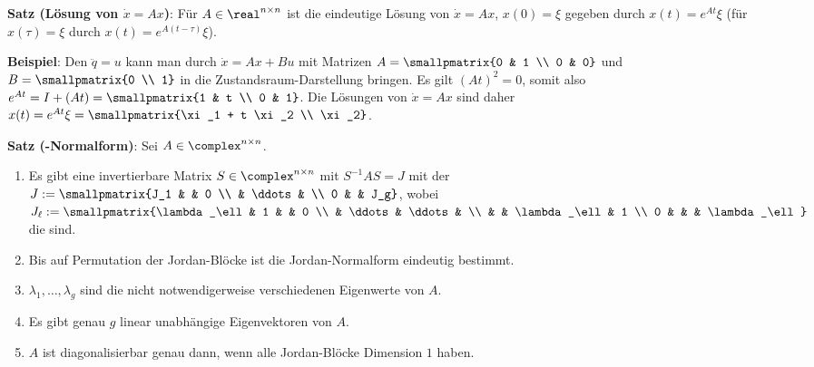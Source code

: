 \textbf{Satz (Lösung von $\dot{x} = Ax$)}:
Für $A \in \real^{n \times n}$ ist die eindeutige Lösung von $\dot{x} = Ax$, $x(0) = \xi$
gegeben durch $x(t) = e^{At} \xi$
(für $x(\tau) = \xi$ durch $x(t) = e^{A(t - \tau)} \xi$).

\textbf{Beispiel}:
Den  $\ddot{q} = u$ kann man durch
$\dot{x} = Ax + Bu$ mit Matrizen $A = \smallpmatrix{0 & 1 \\ 0 & 0}$ und
$B = \smallpmatrix{0 \\ 1}$ in die Zustandsraum-Darstellung bringen.
Es gilt $(At)^2 = 0$, somit also $e^{At} = I + (At) = \smallpmatrix{1 & t \\ 0 & 1}$.
Die Lösungen von $\dot{x} = Ax$ sind daher
$x(t) = e^{At} \xi = \smallpmatrix{\xi_1 + t \xi_2 \\ \xi_2}$.

\linie
\pagebreak

\textbf{Satz (-Normalform)}:
Sei $A \in \complex^{n \times n}$.
\begin{enumerate}
    \item
    Es gibt eine invertierbare Matrix $S \in \complex^{n \times n}$ mit
    $S^{-1} A S = J$
    mit der 
    $J := \smallpmatrix{J_1 & & 0 \\ & \ddots & \\ 0 & & J_g}$, wobei
    $J_\ell := \smallpmatrix{\lambda_\ell & 1 & & 0 \\ & \ddots & \ddots & \\
    & & \lambda_\ell & 1 \\ 0 & & & \lambda_\ell}$ die
     sind.

    \item
    Bis auf Permutation der Jordan-Blöcke ist die Jordan-Normalform eindeutig bestimmt.

    \item
    $\lambda_1, \dotsc, \lambda_g$ sind die nicht notwendigerweise verschiedenen
    Eigenwerte von $A$.

    \item
    Es gibt genau $g$ linear unabhängige Eigenvektoren von $A$.

    \item
    $A$ ist diagonalisierbar genau dann, wenn alle Jordan-Blöcke Dimension $1$ haben.
\end{enumerate}

